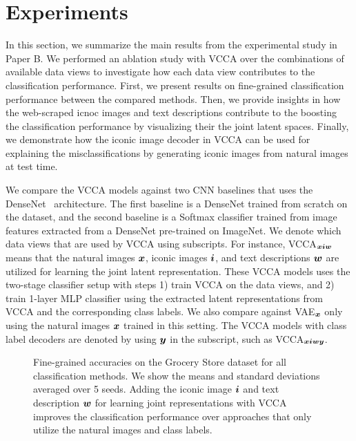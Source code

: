 \section{Experiments}\label{chap3:sec:experiments}

In this section, we summarize the main results from the experimental study in Paper B. We performed an ablation study with VCCA over the combinations of available data views to investigate how each data view contributes to the classification performance. First, we present results on fine-grained classification performance between the compared methods. Then, we provide insights in how the web-scraped icnoc images and text descriptions contribute to the boosting the classification performance by visualizing their the joint latent spaces. Finally, we demonstrate how the iconic image decoder in VCCA can be used for explaining the misclassifications by generating iconic images from natural images at test time. 

We compare the VCCA models against two CNN baselines that uses the DenseNet~\cite{huang2017densely} architecture. The first baseline is a DenseNet trained from scratch on the dataset, and the second baseline is a Softmax classifier trained from image features extracted from a DenseNet pre-trained on ImageNet. We denote which data views that are used by VCCA using subscripts. For instance, VCCA$_{{\bm{x}} {\bm{i}} {\bm{w}}}$ means that the natural images ${\bm{x}}$, iconic images ${\bm{i}}$, and text descriptions ${\bm{w}}$ are utilized for learning the joint latent representation. These VCCA models uses the two-stage classifier setup with steps 1) train VCCA on the data views, and 2) train 1-layer MLP classifier using the extracted latent representations from VCCA and the corresponding class labels. We also compare against VAE$_{{\bm{x}}}$ only using the natural images ${\bm{x}}$ trained in this setting. The VCCA models with class label decoders are denoted by using ${\bm{y}}$ in the subscript, such as VCCA$_{{\bm{x}} {\bm{i}} {\bm{w}} {\bm{y}}}$. 

\begin{figure}[t]
	\centering
	\setlength{\figwidth}{0.62\textwidth}
	\setlength{\figheight}{.22\textheight}
	
	\vspace{-2mm}
	\caption{Fine-grained accuracies on the Grocery Store dataset for all classification methods. We show the means and standard deviations averaged over 5 seeds. Adding the iconic image ${\bm{i}}$ and text description ${\bm{w}}$ for learning joint representations with VCCA improves the classification performance over approaches that only utilize the natural images and class labels.}
	\label{fig:fine_grained_classification_results}
	\vspace{-4mm}
\end{figure}

